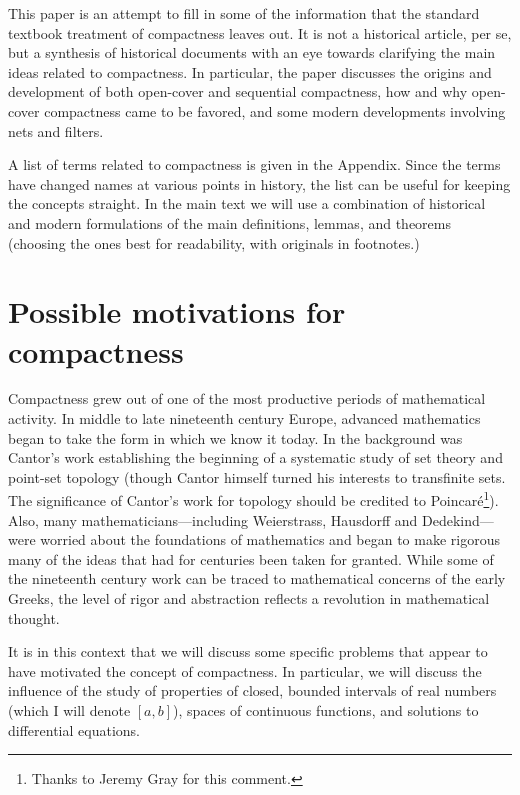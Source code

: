 \documentclass[12pt]{article}
\begin{document}
This paper is an attempt to fill in some of the information that the standard textbook treatment of compactness leaves out. It is not a historical article, per se, but a synthesis of historical documents with an eye towards clarifying the main ideas related to compactness. In particular, the paper discusses the origins and development of both open-cover and sequential compactness, how and why open-cover compactness came to be favored, and some modern developments involving nets and filters.

A list of terms related to compactness is given in the Appendix. Since the terms have changed names at various points in history, the list can be useful for keeping the concepts straight. In the main text we will use a combination of historical and modern formulations of the main definitions, lemmas, and theorems (choosing the ones best for readability, with originals in footnotes.)\\


\section{Possible motivations for compactness}
Compactness grew out of one of the most productive periods of mathematical activity. 
In middle to late nineteenth century Europe, advanced mathematics began to take the
form in which we know it today. In the background was Cantor's work establishing the
beginning of a systematic study of set theory and point-set topology (though Cantor himself
turned his interests to transfinite sets. The significance of Cantor's work for topology should
be credited to Poincar\'{e}\footnote{Thanks to Jeremy Gray for this comment.}). Also, many
mathematicians---including Weierstrass, Hausdorff and Dedekind---were worried about the
foundations of mathematics and began to make rigorous many of the ideas that had for
centuries been taken for granted. While some of the nineteenth century work can be
traced to mathematical concerns of the early Greeks, the level of rigor and
abstraction reflects a revolution in mathematical thought.

It is in this context that we will discuss some specific problems that appear to have
motivated the concept of compactness. In particular, we will discuss the influence of
the study of properties of closed, bounded intervals of real numbers (which I will
denote $[a,b]$), spaces of continuous functions, and solutions to differential
equations. 
\end{document}
